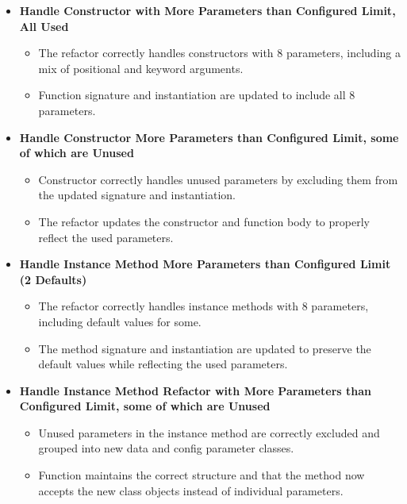 \documentclass[12pt, titlepage]{article}
\begin{document}
  \begin{itemize}
    \item \textbf{Handle Constructor with More Parameters than
      Configured Limit, All Used}
      \begin{itemize}
        \item The refactor correctly handles constructors with 8
          parameters, including a mix of positional and keyword arguments.
        \item Function signature and instantiation are updated to
          include all 8 parameters.
      \end{itemize}

    \item \textbf{Handle Constructor More Parameters than Configured
      Limit, some of which are Unused}
      \begin{itemize}
        \item Constructor correctly handles unused parameters by
          excluding them from the updated signature and instantiation.
        \item The refactor updates the constructor and function body
          to properly reflect the used parameters.
      \end{itemize}

    \item \textbf{Handle Instance Method More Parameters than
      Configured Limit (2 Defaults)}
      \begin{itemize}
        \item The refactor correctly handles instance methods with 8
          parameters, including default values for some.
        \item The method signature and instantiation are updated to
          preserve the default values while reflecting the used parameters.
      \end{itemize}

    \item \textbf{Handle Instance Method Refactor with More
      Parameters than Configured Limit, some of which are Unused}
      \begin{itemize}
        \item Unused parameters in the instance method are correctly
          excluded and grouped into new data and config parameter classes.
        \item Function maintains the correct structure and that the
          method now accepts the new class objects instead of
          individual parameters.
      \end{itemize}


\end{itemize}
\end{document}
